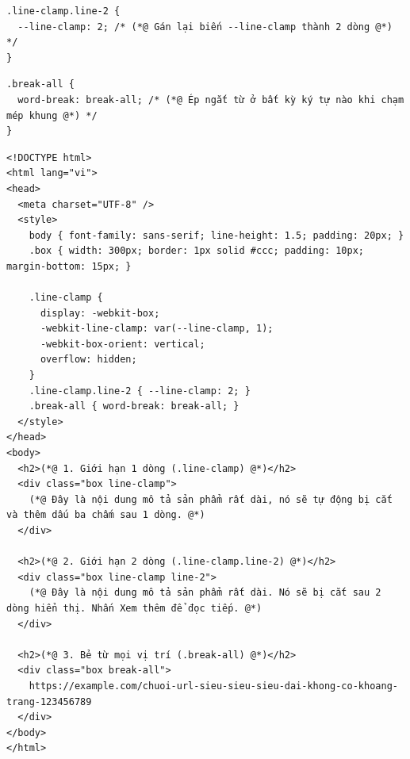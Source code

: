 \documentclass[11pt,oneside]{book}
\begin{document}
\begin{codeWindow}
\begin{lstlisting}[language=CSS3]
.line-clamp.line-2 {
  --line-clamp: 2; /* (*@ Gán lại biến --line-clamp thành 2 dòng @*) */
}
\end{lstlisting}
\end{codeWindow}

\begin{codeWindow}
\begin{lstlisting}[language=CSS3]
.break-all {
  word-break: break-all; /* (*@ Ép ngắt từ ở bất kỳ ký tự nào khi chạm mép khung @*) */
}
\end{lstlisting}
\end{codeWindow}

\begin{codeWindow}
\begin{lstlisting}[language=HTML5]
<!DOCTYPE html>
<html lang="vi">
<head>
  <meta charset="UTF-8" />
  <style>
    body { font-family: sans-serif; line-height: 1.5; padding: 20px; }
    .box { width: 300px; border: 1px solid #ccc; padding: 10px; margin-bottom: 15px; }
    
    .line-clamp {
      display: -webkit-box;
      -webkit-line-clamp: var(--line-clamp, 1);
      -webkit-box-orient: vertical;
      overflow: hidden;
    }
    .line-clamp.line-2 { --line-clamp: 2; }
    .break-all { word-break: break-all; }
  </style>
</head>
<body>
  <h2>(*@ 1. Giới hạn 1 dòng (.line-clamp) @*)</h2>
  <div class="box line-clamp">
    (*@ Đây là nội dung mô tả sản phẩm rất dài, nó sẽ tự động bị cắt và thêm dấu ba chấm sau 1 dòng. @*)
  </div>

  <h2>(*@ 2. Giới hạn 2 dòng (.line-clamp.line-2) @*)</h2>
  <div class="box line-clamp line-2">
    (*@ Đây là nội dung mô tả sản phẩm rất dài. Nó sẽ bị cắt sau 2 dòng hiển thị. Nhấn Xem thêm để đọc tiếp. @*)
  </div>

  <h2>(*@ 3. Bẻ từ mọi vị trí (.break-all) @*)</h2>
  <div class="box break-all">
    https://example.com/chuoi-url-sieu-sieu-sieu-dai-khong-co-khoang-trang-123456789
  </div>
</body>
</html>
\end{lstlisting}
\end{codeWindow}
\end{document}
